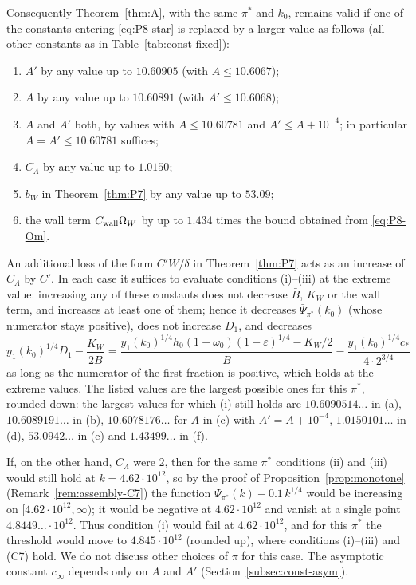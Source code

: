 \documentclass[11pt]{amsart}
\newcommand{\eps}{\varepsilon}
\newcommand{\Lam}{\Lambda}
\theoremstyle{definition}
\theoremstyle{remark}
\numberwithin{equation}{section}
\begin{document}
Consequently Theorem~\ref{thm:A}, with the same $\pi^*$ and $k_0$, remains valid if one of the constants entering
\eqref{eq:P8-star} is replaced by a larger value as follows (all other constants as in Table~\ref{tab:const-fixed}):
\begin{enumerate}[label=(\alph*)]
\item $A'$ by any value up to $10.60905$ (with $A\le10.6067$);
\item $A$ by any value up to $10.60891$ (with $A'\le10.6068$);
\item $A$ and $A'$ both, by values with $A\le10.60781$ and $A'\le A+10^{-4}$; in particular $A=A'\le10.60781$
  suffices;
\item $C_\Lam$ by any value up to $1.0150$;
\item $b_W$ in Theorem~\ref{thm:P7} by any value up to $53.09$;
\item the wall term $C_{\rm wall}\Omega_W$ by up to $1.434$ times the bound obtained from \eqref{eq:P8-Om}.
\end{enumerate}
An additional loss of the form $C'W/\delta$ in Theorem~\ref{thm:P7} acts as an increase of $C_\Lam$ by $C'$. In each
case it suffices to evaluate conditions (i)--(iii) at the extreme value: increasing any of these constants does not
decrease $\bar B$, $K_W$ or the wall term, and increases at least one of them; hence it decreases
$\bar\Psi_{\pi^*}(k_0)$ (whose numerator stays positive), does not increase $D_1$, and decreases
\[
y_1(k_0)^{1/4}D_1-\frac{K_W}{2\bar B}=\frac{y_1(k_0)^{1/4}h_0(1-\omega_0)(1-\eps)^{1/4}-K_W/2}{\bar B}
-\frac{y_1(k_0)^{1/4}c_*}{4\cdot2^{3/4}}
\]
as long as the numerator of the first fraction is positive, which holds at the extreme values. The listed values are
the largest possible ones for this $\pi^*$, rounded down: the largest values for which (i) still holds are
$10.6090514\ldots$ in (a), $10.6089191\ldots$ in (b), $10.6078176\ldots$ for $A$ in (c) with $A'=A+10^{-4}$,
$1.0150101\ldots$ in (d), $53.0942\ldots$ in (e) and $1.43499\ldots$ in (f).

If, on the other hand, $C_\Lam$ were $2$, then for the same $\pi^*$ conditions (ii) and (iii) would still hold at
$k=4.62\cdot10^{12}$, so by the proof of Proposition~\ref{prop:monotone} (Remark~\ref{rem:assembly-C7}) the function
$\bar\Psi_{\pi^*}(k)-0.1\,k^{1/4}$ would be increasing on $[4.62\cdot10^{12},\infty)$; it would be negative at
$4.62\cdot10^{12}$ and vanish at a single point $4.8449\ldots\cdot10^{12}$. Thus condition (i) would fail at
$4.62\cdot10^{12}$, and for this $\pi^*$ the threshold would move to $4.845\cdot10^{12}$ (rounded up), where conditions
(i)--(iii) and (C7) hold. We do not discuss other choices of $\pi$ for this case. The asymptotic constant $c_\infty$
depends only on $A$ and $A'$ (Section~\ref{subsec:const-asym}).
\end{document}
